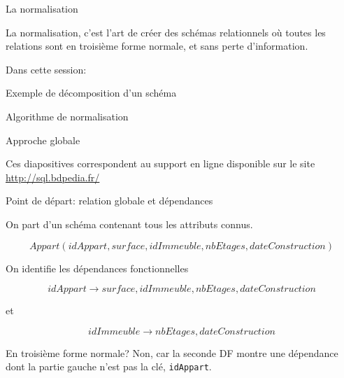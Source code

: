 
\begin{frame}[fragile]{La normalisation}

La normalisation, c'est l'art de créer des schémas relationnels où toutes
les relations sont en troisième forme normale, et sans perte d'information.

\vfill

Dans cette session:

\begin{redbullet}
  \item Exemple de décomposition d'un schéma
  \item Algorithme de normalisation
  \item Approche globale
\end{redbullet}


\vfill
\begin{blocgauche}
\alert{Ces diapositives correspondent au support en ligne disponible sur
le site \url{http://sql.bdpedia.fr/}}
\end{blocgauche}

\end{frame}


\begin{frame}{Point de départ: relation globale et dépendances}

On part d'un schéma contenant tous les attributs connus.

\vfill

$$Appart(idAppart, surface, idImmeuble, nbEtages, dateConstruction)$$

\vfill

On identifie les dépendances fonctionnelles

$$idAppart \to  surface, idImmeuble, nbEtages, dateConstruction$$

et

$$idImmeuble \to nbEtages, dateConstruction$$

\vfill
\begin{blocgauche}
\begin{remblock}{En troisième forme normale?}
Non, car la seconde DF montre
une dépendance  dont la partie gauche n'est pas la clé, 
\texttt{idAppart}. \end{remblock}
\end{blocgauche}
\end{frame}

